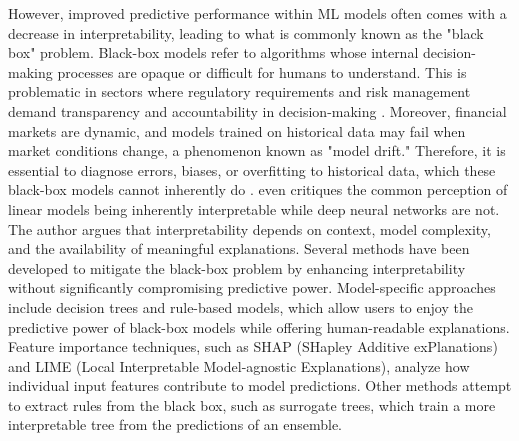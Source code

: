However, improved predictive performance within ML models often comes with a decrease in interpretability, leading to what is commonly known as the "black box" problem. Black-box models refer to algorithms whose internal decision-making processes are opaque or difficult for humans to understand. This is problematic in sectors where regulatory requirements and risk management demand transparency and accountability in decision-making \cite{brozek_2024}. Moreover, financial markets are dynamic, and models trained on historical data may fail when market conditions change, a phenomenon known as "model drift." Therefore, it is essential to diagnose errors, biases, or overfitting to historical data, which these black-box models cannot inherently do \cite{cohen_2021}.  even critiques the common perception of linear models being inherently interpretable while deep neural networks are not. The author argues that interpretability depends on context, model complexity, and the availability of meaningful explanations. Several methods have been developed to mitigate the black-box problem by enhancing interpretability without significantly compromising predictive power. Model-specific approaches include decision trees and rule-based models, which allow users to enjoy the predictive power of black-box models while offering human-readable explanations. Feature importance techniques, such as SHAP (SHapley Additive exPlanations) and LIME (Local Interpretable Model-agnostic Explanations), analyze how individual input features contribute to model predictions. Other methods attempt to extract rules from the black box, such as surrogate trees, which train a more interpretable tree from the predictions of an ensemble.


